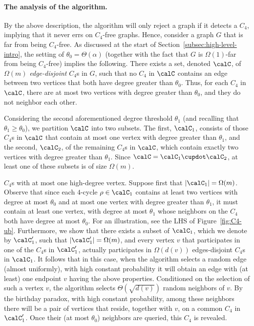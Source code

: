 \paragraph{The analysis of the algorithm.}
By the above description, the algorithm will only reject a graph if it detects a $C_4$, implying that it never errs on $C_4$-free graphs. Hence, consider a graph $G$ that is far from being $C_4$-free. As discussed at the start of Section~\ref{subsec:high-level-intro}, the setting of $\theta_0=\Theta(\alpha)$ (together with the fact that $G$ is $\Omega(1)$-far from being $C_4$-free) implies the following. There exists a set, denoted $\calC$, of $\Omega(m)$ \emph{edge-disjoint} $C_4$s in $G$, such that
 no $C_4$ in $\calC$ contains an edge
between two vertices that both have degree greater than $\theta_0$. 
Thus, for each $C_4 $ in $\calC$, there are at most two vertices with degree greater than $\theta_0$, and they do not neighbor each other. 

Considering the second aforementioned  degree threshold $\theta_1$
(and recalling that %
$\theta_1 \geq \theta_0$), we partition $\calC$ into two subsets. The first, $\calC_1$, consists of those $C_4$s in $\calC$ that contain at most one vertex with degree greater than $\theta_1$, and the second, $\calC_2$, of the remaining $C_4$s in $\calC$, which contain exactly two vertices with degree greater than $\theta_1$.
Since $\calC = \calC_1 \cupdot \calC_2$, at least one of these subsets is of size $\Omega(m)$.

\smallskip\noindent\textsf{$C_4$s with at most one high-degree vertex.}
Suppose first that $|\calC_1|=\Omega(m)$. Observe  that since each $4$-cycle $\rho\in \calC_1$ contains at least two vertices with degree at most $\theta_0$ and at most one vertex with degree greater than $\theta_1$, it must contain at least one vertex, with degree at most $\theta_1$ whose neighbors on the $C_4$ both have degree at most $\theta_0$. For an illustration, see the LHS of Figure~\ref{fig:C4-ub}. 
Furthermore, we show that there exists a subset of $\calC_1$, which we denote by $\calC_1'$, such that $|\calC_1'|=\Omega(m)$, and every vertex $v$ that participates in one of the $C_4$s in $\calC_1'$, actually participates in $\Omega(d(v))$ edges-disjoint $C_4$s in $\calC_1$. 
It follows that in this case, when the algorithm selects a random edge (almost uniformly), with high constant probability it will obtain an edge with (at least) one endpoint $v$ having the above properties. Conditioned on the selection of such a vertex $v$,
the algorithm selects $\Theta(\sqrt{d(v)})$ random neighbors of $v$. By the birthday paradox, with high constant probability, among these neighbors there will be a pair of vertices that reside, together with $v$, on a common $C_4$ in $\calC_1'$. Once their (at most $\theta_0$) neighbors are queried, this $C_4$ is revealed.

